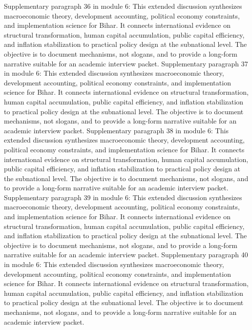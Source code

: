 \documentclass[preprint,12pt]{elsarticle}
\begin{document}
Supplementary paragraph 36 in module 6: This extended discussion synthesizes macroeconomic theory, development accounting, political economy constraints, and implementation science for Bihar. It connects international evidence on structural transformation, human capital accumulation, public capital efficiency, and inflation stabilization to practical policy design at the subnational level. The objective is to document mechanisms, not slogans, and to provide a long-form narrative suitable for an academic interview packet.
Supplementary paragraph 37 in module 6: This extended discussion synthesizes macroeconomic theory, development accounting, political economy constraints, and implementation science for Bihar. It connects international evidence on structural transformation, human capital accumulation, public capital efficiency, and inflation stabilization to practical policy design at the subnational level. The objective is to document mechanisms, not slogans, and to provide a long-form narrative suitable for an academic interview packet.
Supplementary paragraph 38 in module 6: This extended discussion synthesizes macroeconomic theory, development accounting, political economy constraints, and implementation science for Bihar. It connects international evidence on structural transformation, human capital accumulation, public capital efficiency, and inflation stabilization to practical policy design at the subnational level. The objective is to document mechanisms, not slogans, and to provide a long-form narrative suitable for an academic interview packet.
Supplementary paragraph 39 in module 6: This extended discussion synthesizes macroeconomic theory, development accounting, political economy constraints, and implementation science for Bihar. It connects international evidence on structural transformation, human capital accumulation, public capital efficiency, and inflation stabilization to practical policy design at the subnational level. The objective is to document mechanisms, not slogans, and to provide a long-form narrative suitable for an academic interview packet.
Supplementary paragraph 40 in module 6: This extended discussion synthesizes macroeconomic theory, development accounting, political economy constraints, and implementation science for Bihar. It connects international evidence on structural transformation, human capital accumulation, public capital efficiency, and inflation stabilization to practical policy design at the subnational level. The objective is to document mechanisms, not slogans, and to provide a long-form narrative suitable for an academic interview packet.
\end{document}
